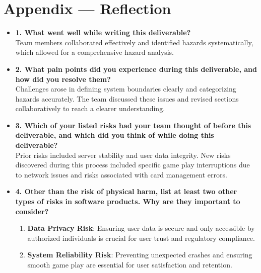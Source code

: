 \documentclass[12pt]{article}
\begin{document}
\section*{Appendix --- Reflection}
\begin{itemize}
    \item \textbf{1. What went well while writing this deliverable?}\\
    Team members collaborated effectively and identified hazards systematically, which allowed for a comprehensive hazard analysis.

    \item \textbf{2. What pain points did you experience during this deliverable, and how did you resolve them?}\\
    Challenges arose in defining system boundaries clearly and categorizing hazards accurately. The team discussed these issues and revised sections collaboratively to reach a clearer understanding.

    \item \textbf{3. Which of your listed risks had your team thought of before this deliverable, and which did you think of while doing this deliverable?}\\
    Prior risks included server stability and user data integrity. New risks discovered during this process included specific game play interruptions due to network issues and risks associated with card management errors.

    \item \textbf{4. Other than the risk of physical harm, list at least two other types of risks in software products. Why are they important to consider?}\\
    \begin{enumerate}
        \item \textbf{Data Privacy Risk}: Ensuring user data is secure and only accessible by authorized individuals is crucial for user trust and regulatory compliance.
        \item \textbf{System Reliability Risk}: Preventing unexpected crashes and ensuring smooth game play are essential for user satisfaction and retention.
    \end{enumerate}
\end{itemize}
\end{document}
